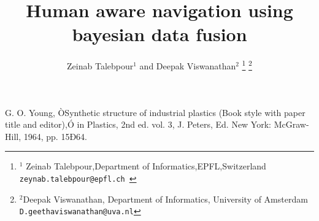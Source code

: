 \documentclass[letterpaper, 10 pt, conference]{ieeeconf}  %
\title{\LARGE \bf
Human aware navigation using bayesian data fusion
}
\author{Zeinab Talebpour$^{1}$ and Deepak Viswanathan$^{2}$%
\thanks{$^{1}$ Zeinab Talebpour,Department of Informatics,EPFL,Switzerland
        {\tt\small zeynab.talebpour@epfl.ch }}%
\thanks{$^{2}$Deepak Viswanathan, Department of Informatics, University of Amsterdam
        {\tt\small D.geethaviswanathan@uva.nl}}%
}
\begin{document}
\maketitle
\thispagestyle{empty}
\pagestyle{empty}

\begin{abstract}


\end{abstract}








\begin{thebibliography}{99}

 G. O. Young, ÒSynthetic structure of industrial plastics (Book style with paper title and editor),Ó 	in Plastics, 2nd ed. vol. 3, J. Peters, Ed.  New York: McGraw-Hill, 1964, pp. 15Ð64.

\end{thebibliography}
\end{document}
